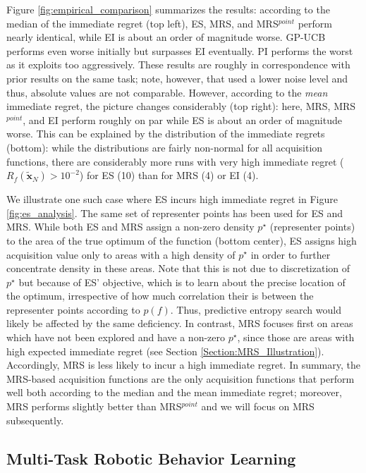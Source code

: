 \documentclass[10pt,letterpaper]{article} %
\begin{document}
Figure \ref{fig:empirical_comparison} summarizes the results: according to the
median of the immediate regret (top left), ES, MRS, and MRS$^{point}$ perform
nearly identical, while EI is about an order of magnitude worse. GP-UCB performs
even worse initially but surpasses EI eventually. PI performs the worst as it
exploits too aggressively. These results are roughly in correspondence with prior
results \cite{hennig_entropy_2012,hernandez-lobato_predictive_2014} on the same
task; note, however, that \citet{hernandez-lobato_predictive_2014} used a lower
noise level and thus, absolute values are not comparable. However, according to
the \emph{mean} immediate regret, the picture changes considerably (top right):
here, MRS, MRS$^{point}$, and EI perform roughly on par while ES is about an order of
magnitude worse. This can be explained by the distribution of the immediate
regrets (bottom): while the distributions are fairly non-normal for all
acquisition functions, there are considerably more runs with very high immediate
regret ($R_f(\mathbf{\tilde x}_N)>10^{-2}$) for ES (10) than for MRS (4) or EI (4).

We illustrate one such case where ES incurs high immediate regret in Figure
\ref{fig:es_analysis}. The same set of representer points has been used for ES and MRS.
While both ES and MRS assign a non-zero density $p^\star$
(representer points) to the area of the true optimum of the function
(bottom center), ES assigns high acquisition value only to areas with a high
density of $p^\star$ in order to further concentrate density in these areas.
Note that this is not due to discretization of $p^\star$ but because of ES'
objective, which is to learn about the precise location of the optimum, irrespective of
how much correlation their is between the representer points according to $p(f)$.
Thus, predictive entropy search \cite{hernandez-lobato_predictive_2014} would likely be affected by the
same deficiency. In contrast, MRS focuses first on areas which have not been
explored and have a non-zero $p^\star$, since those are areas with high expected
immediate regret (see Section \ref{Section:MRS_Illustration}). Accordingly, MRS is less likely to incur a high immediate regret. In summary, the MRS-based acquisition functions are the only
acquisition functions that perform well both according to the median and the
mean immediate regret; moreover, MRS performs slightly better than
MRS$^{point}$ and we will focus on MRS subsequently.



\subsection{Multi-Task Robotic Behavior Learning} \label{Section:ResultsMultiTask}
\end{document}
